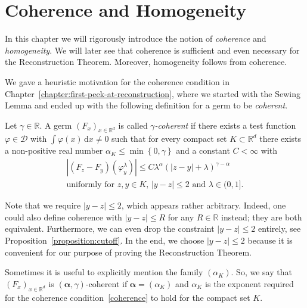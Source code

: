 \section{Coherence and Homogeneity}\label{chapter:coherence}

In this chapter we will rigorously introduce the notion of \emph{coherence} and \emph{homogeneity}. We will later see that coherence is sufficient and even necessary for the Reconstruction Theorem. Moreover, homogeneity follows from coherence.

We gave a heuristic motivation for the coherence condition in Chapter~\ref{chapter:first-peek-at-reconstruction}, where we started with the Sewing Lemma and ended up with the following definition for a germ to be \emph{coherent}.

\begin{definition}\label{definition:coherence}
   Let \(\gamma \in \mathbb{R}\). A germ \({(F_x)}_{x \in \mathbb{R}^d}\) is called \emph{\(\gamma\)-coherent} if there exists a test function \(\varphi \in \mathcal{D}\) with \(\int \varphi(x) \, \mathrm{d}x \neq 0\) such that for every compact set \(K \subset \mathbb{R}^d\) there exists a non-positive real number \(\alpha_K \leq \min\left\{ 0, \gamma \right\}\) and a constant \(C < \infty\) with
   \begin{gather}\label{coherence}
        |(F_z - F_y)(\varphi^\lambda_y)| \leq C\lambda^\alpha{(|z-y| + \lambda)}^{\gamma - \alpha}  \\ \text{uniformly for \(z,y \in K\), \(|y-z| \leq 2\)  and \(\lambda \in (0,1]\)} \nonumber. %
   \end{gather}
\end{definition}
\begin{remark}\label{remark:cutoff}
    Note that we require \(|y-z| \leq 2\), which appears rather arbitrary. Indeed, one could also define coherence with \(|y-z| \leq R\) for any \(R \in \mathbb{R}\) instead; they are both equivalent. Furthermore, we can even drop the constraint \(|y-z| \leq 2\) entirely, see Proposition~\ref{proposition:cutoff}. In the end, we choose \(|y-z| \leq 2\) because it is convenient for our purpose of proving the Reconstruction Theorem.
\end{remark}

Sometimes it is useful to explicitly mention the family \((\alpha_K)\). So, we say that  \({(F_x)}_{x \in \mathbb{R}^d}\) is \((\bm{\alpha}, \gamma)\)-coherent if \(\bm \alpha = (\alpha_K)\) and \(\alpha_K\) is the exponent required for the coherence condition~\eqref{coherence} to hold for the compact set \(K\). 

